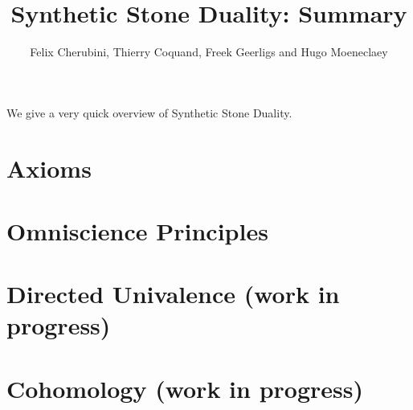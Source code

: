 \documentclass{../util/zariski-small}
\title{Synthetic Stone Duality: Summary}
\begin{document}
\author{Felix Cherubini, Thierry Coquand, Freek Geerligs and Hugo Moeneclaey}

\maketitle

We give a very quick overview of Synthetic Stone Duality.

\section{Axioms}


\section{Omniscience Principles}


\section{Directed Univalence (work in progress)}


\section{Cohomology (work in progress)}

\end{document}
